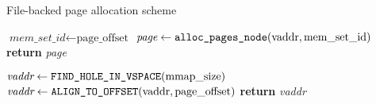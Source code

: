 \begin{algorithm}
  \caption{File-backed page allocation scheme}\label{alg:file-backed}
  \begin{algorithmic}[1]
    \State $\textit{mem\_set\_id} \gets \mbox{page\_offset}$
    \State $\textit{page} \gets \verb|alloc_pages_node|(\mbox{vaddr}, \mbox{mem\_set\_id})$
    \State \textbf{return} \textit{page}
    \EndProcedure

    \State $\textit{vaddr} \gets \verb|FIND_HOLE_IN_VSPACE|(\mbox{mmap\_size})$
    \State $\textit{vaddr} \gets \verb|ALIGN_TO_OFFSET|(\mbox{vaddr}, \mbox{page\_offset})$
    \State \textbf{return} \textit{vaddr}
    \EndProcedure
  \end{algorithmic}
\end{algorithm}
